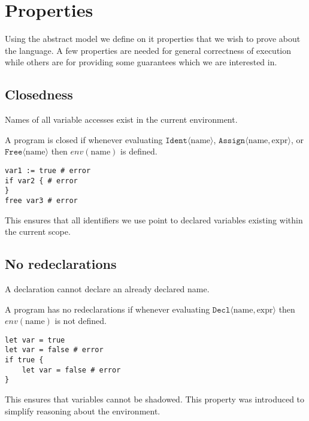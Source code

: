 \section{Properties}\label{sec:properties}

Using the abstract model we define on it properties that we wish to prove about the language. A few properties are needed for general correctness of execution while others are for providing some guarantees which we are interested in.

\subsection{Closedness}\label{sec:properties-closedness}

Names of all variable accesses exist in the current environment.

\begin{definition}[Closedness]
    A program is closed if whenever evaluating $\texttt{Ident}\langle \text{name} \rangle$, $\texttt{Assign}\langle \text{name}, \text{expr} \rangle$, or $\texttt{Free}\langle \text{name} \rangle$ then $env(\text{name})$ is defined.
\end{definition}

\begin{lstlisting}
var1 := true # error
if var2 { # error
}
free var3 # error
\end{lstlisting}

This ensures that all identifiers we use point to declared variables existing within the current scope.

\subsection{No redeclarations}\label{sec:properties-noredecl}

A declaration cannot declare an already declared name.

\begin{definition}[No redeclarations]
    A program has no redeclarations if whenever evaluating $\texttt{Decl}\langle \text{name}, \text{expr} \rangle$ then $env(\text{name})$ is not defined.
\end{definition}

\begin{lstlisting}
let var = true
let var = false # error
if true {
    let var = false # error
}
\end{lstlisting}

This ensures that variables cannot be shadowed. This property was introduced to simplify reasoning about the environment.

